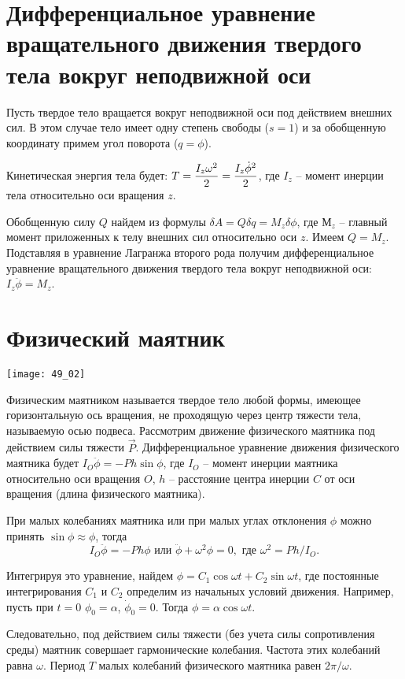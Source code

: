 \section{Дифференциальное уравнение вращательного движения твердого тела вокруг
неподвижной оси}
Пусть твердое тело вращается вокруг неподвижной оси под действием внешних сил.
В этом случае тело имеет одну степень свободы (\( s = 1 \)) и за обобщенную
координату примем угол поворота (\( q = \phi \)).

Кинетическая энергия тела будет:
\( \displaystyle T = \frac{I_z\omega^2}{2} = \frac{I_z\dot{\phi}^2}{2} \), 
где \( I_z \) -- момент инерции тела относительно оси вращения \( z \).

Обобщенную силу \( Q \) найдем из формулы
\( \delta A = Q\delta q = M_z\delta\phi \), где \( М_z \) -- главный момент
приложенных к телу внешних сил относительно оси \( z \). Имеем \( Q = M_z \).
Подставляя в уравнение Лагранжа второго рода получим дифференциальное уравнение
вращательного движения твердого тела вокруг неподвижной оси:
\( I_z\ddot{\phi} = M_z \).

\section{Физический маятник}
\begin{minipage}{.35\textwidth}
    \texttt{[image: 49\_02]}
\end{minipage}
\begin{minipage}{.6\textwidth}
Физическим маятником называется твердое тело любой формы, имеющее горизонтальную
ось вращения, не проходящую через центр тяжести тела, называемую осью подвеса.
Рассмотрим движение физического маятника под действием силы тяжести
\( \vec{P} \). Дифференциальное уравнение движения физического маятника будет
\( I_O\ddot{\phi} = -Ph\sin\phi \), где \( I_O \) -- момент инерции маятника
относительно оси вращения \( O \), \( h \) -- расстояние центра инерции \( C \)
от оси вращения (длина физического маятника).
\end{minipage}

При малых колебаниях маятника или при малых углах отклонения \( \phi \) можно
принять \( \sin\phi \approx \phi \), тогда
\[
    I_O\ddot{\phi} = -Ph\phi \text{ или } \ddot{\phi} + \omega^2\phi = 0,
    \text{ где } \omega^2 = Ph/I_O.
\]

Интегрируя это уравнение, найдем \( \phi = C_1\cos\omega t + C_2\sin\omega t \),
где постоянные интегрирования \( C_1 \) и \( C_2 \) определим из начальных
условий движения. Например, пусть при \( t = 0 \) \( \phi_0 = \alpha \),
\( \dot{\phi}_0 = 0 \). Тогда \( \phi =\alpha\cos\omega t \).

Следовательно, под действием силы тяжести (без учета силы сопротивления среды)
маятник совершает гармонические колебания. Частота этих колебаний равна
\( \omega \). Период \( T \) малых колебаний физического маятника равен
\( 2\pi/\omega \).

\newpage
